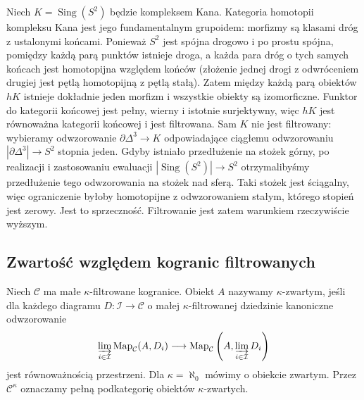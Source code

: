 \begin{przyklad}\label{cat:ex:infty-filtered-homotopy-insufficient}
Niech $K=\operatorname{Sing}(S^2)$ będzie kompleksem Kana. Kategoria homotopii kompleksu Kana jest jego fundamentalnym grupoidem: morfizmy są klasami dróg z ustalonymi końcami. Ponieważ $S^2$ jest spójna drogowo i po prostu spójna, pomiędzy każdą parą punktów istnieje droga, a każda para dróg o tych samych końcach jest homotopijna względem końców (złożenie jednej drogi z odwróceniem drugiej jest pętlą homotopijną z pętlą stałą). Zatem między każdą parą obiektów $hK$ istnieje dokładnie jeden morfizm i wszystkie obiekty są izomorficzne. Funktor do kategorii końcowej jest pełny, wierny i istotnie surjektywny, więc $hK$ jest równoważna kategorii końcowej i jest filtrowana. Sam $K$ nie jest filtrowany: wybieramy odwzorowanie $\partial\Delta^3\to K$ odpowiadające ciągłemu odwzorowaniu $|\partial\Delta^3|\to S^2$ stopnia jeden. Gdyby istniało przedłużenie na stożek górny, po realizacji i zastosowaniu ewaluacji $|\operatorname{Sing}(S^2)|\to S^2$ otrzymalibyśmy przedłużenie tego odwzorowania na stożek nad sferą. Taki stożek jest ściągalny, więc ograniczenie byłoby homotopijne z odwzorowaniem stałym, którego stopień jest zerowy. Jest to sprzeczność. Filtrowanie jest zatem warunkiem rzeczywiście wyższym.
\end{przyklad}

\subsection{Zwartość względem kogranic filtrowanych}

\begin{definicja}\label{cat:def:infty-kappa-compact}
Niech $\mathcal C$ ma małe $\kappa$-filtrowane kogranice. Obiekt $A$ nazywamy $\kappa$-zwartym, jeśli dla każdego diagramu $D:\mathcal I\to\mathcal C$ o małej $\kappa$-filtrowanej dziedzinie kanoniczne odwzorowanie
\begin{equation}\label{cat:eq:infty-kappa-compact}
 \varinjlim_{i\in\mathcal I}\operatorname{Map}_{\mathcal C}(A,D_i)
 \longrightarrow
 \operatorname{Map}_{\mathcal C}\left(A,\varinjlim_{i\in\mathcal I}D_i\right)
\end{equation}
jest równoważnością przestrzeni. Dla $\kappa=\aleph_0$ mówimy o obiekcie zwartym. Przez $\mathcal C^\kappa$ oznaczamy pełną podkategorię obiektów $\kappa$-zwartych.
\end{definicja}


